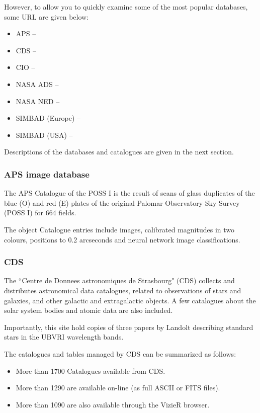 However, to allow you to quickly examine some of the most popular databases, some
URL are given below:

\begin{itemize}
\item APS -- {\HTTPPref} 
\item CDS -- {\HTTPQref}
\item CIO -- {\HTTPRref} 
\item NASA ADS -- {\HTTPSref} 
\item NASA NED -- {\HTTPTref} 
\item SIMBAD (Europe) -- {\HTTPUref} 
\item SIMBAD (USA) -- {\HTTPVref}  
\end{itemize}

Descriptions of the databases and catalogues are given in the next section.

\subsubsection{APS image database} 
\label{sec:aps}
 
The APS Catalogue of the POSS I is the result of scans of glass duplicates of
the blue (O) and red (E) plates of the original Palomar Observatory Sky
Survey (POSS I) for 664 fields.

The object Catalogue entries include images, calibrated magnitudes in two
colours, positions to 0.2 arcseconds and neural network image
classifications. 

\subsubsection{CDS} 
\label{sec:cds}
 
The ``Centre de Donnees astronomiques de Strasbourg" (CDS) collects and distributes
astronomical data catalogues, related to observations of stars and galaxies,
and other galactic and extragalactic objects. A few catalogues about the
solar system bodies and atomic data are also included. 

Importantly, this site hold copies of three papers by Landolt describing standard
stars in the UBVRI wavelength bands. 

The catalogues and tables managed by CDS can be summarized as follows: 

\begin{itemize}
\item  More than 1700 Catalogues available from CDS.
\item  More than 1290 are available on-line (as full ASCII or FITS files).
\item  More than 1090 are also available through the VizieR browser. 
\end{itemize}

